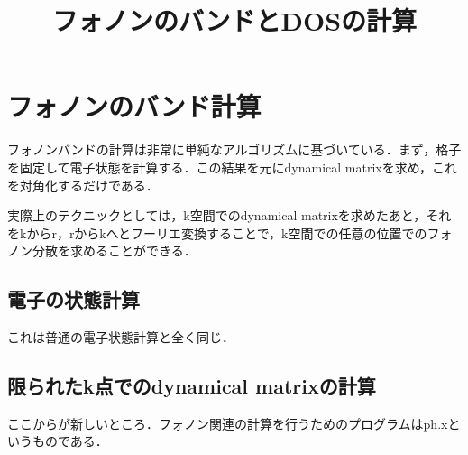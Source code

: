 \documentclass[a4j]{jarticle}
\title{フォノンのバンドとDOSの計算}
\begin{document}
\maketitle



\section{フォノンのバンド計算}
フォノンバンドの計算は非常に単純なアルゴリズムに基づいている．まず，格子を固定して電子状態を計算する．この結果を元にdynamical matrixを求め，これを対角化するだけである．

実際上のテクニックとしては，k空間でのdynamical matrixを求めたあと，それをkからr，rからkへとフーリエ変換することで，k空間での任意の位置でのフォノン分散を求めることができる．

\subsection{電子の状態計算}
これは普通の電子状態計算と全く同じ．

\subsection{限られたk点でのdynamical matrixの計算}
ここからが新しいところ．フォノン関連の計算を行うためのプログラムはph.xというものである．
\end{document}
